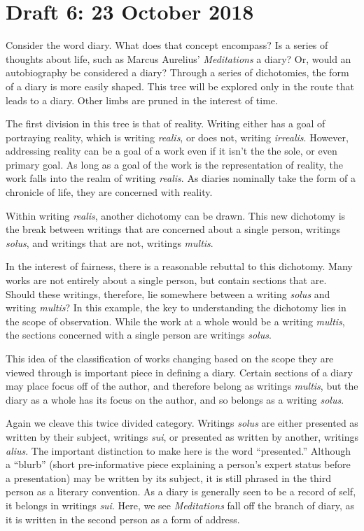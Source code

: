 \documentclass[12pt]{article}[titlepage]
\newcommand{\say}[1]{``#1''}
\newcommand{\1}{\={a}}
\newcommand{\2}{\={e}}
\newcommand{\3}{\={\i}}
\newcommand{\4}{\=o}
\newcommand{\5}{\=u}
\newcommand{\6}{\={A}}
\renewcommand{\,}{\textsuperscript{,}}
\begin{document}
\section{Draft 6: 23 October 2018}
Consider the word diary.
What does that concept encompass?
Is a series of thoughts about life, such as Marcus Aurelius' \textit{Meditations} a diary?
Or, would an autobiography be considered a diary?
Through a series of dichotomies, the form of a diary is more easily shaped. 
This tree will be explored only in the route that leads to a diary.
Other limbs are pruned in the interest of time.

The first division in this tree is that of reality.
Writing either has a goal of portraying reality, which is writing \textit{realis}, or does not, writing \textit{irrealis}.
However, addressing reality can be a goal of a work even if it isn't the the sole, or even primary goal.
As long as a goal of the work is the representation of reality, the work falls into the realm of writing \textit{realis}.
As diaries nominally take the form of a chronicle of life, they are concerned with reality.

Within writing \textit{realis}, another dichotomy can be drawn.
This new dichotomy is the break between writings that are concerned about a single person, writings \textit{solus}, and writings that are not, writings \textit{multis}.

In the interest of fairness, there is a reasonable rebuttal to this dichotomy.
Many works are not entirely about a single person, but contain sections that are.
Should these writings, therefore, lie somewhere between a writing \textit{solus} and writing \textit{multis}?
In this example, the key to understanding the dichotomy lies in the scope of observation.
While the work at a whole would be a writing \textit{multis}, the sections concerned with a single person are writings \textit{solus}.

This idea of the classification of works changing based on the scope they are viewed through is important piece in defining a diary.
Certain sections of a diary may place focus off of the author, and therefore belong as writings \textit{multis}, but the diary as a whole has its focus on the author, and so belongs as a writing \textit{solus}.

Again we cleave this twice divided category.
Writings \textit{solus} are either presented as written by their subject, writings \textit{sui}, or presented as written by another, writings \textit{alius}.
The important distinction to make here is the word \say{presented.}
Although a \say{blurb} (short pre-informative piece explaining a person's expert status before a presentation) may be written by its subject, it is still phrased in the third person as a literary convention.
As a diary is generally seen to be a record of self, it belongs in writings \textit{sui}.
Here, we see \textit{Meditations} fall off the branch of diary, as it is written in the second person as a form of address. 
\end{document}
